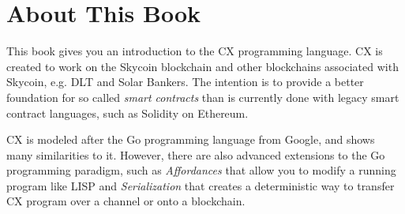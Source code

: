 \documentclass[11pt,fleqn,openany]{book} %
\begin{document}
\noindent \textit{} %



\pagestyle{empty} %

\tableofcontents %


\pagestyle{fancy} %




\chapter{About This Book}
\label{chapter:about-this-book}

This book gives you an introduction to the CX programming language. CX is created to work on the Skycoin blockchain and other blockchains associated with Skycoin, e.g. DLT and Solar Bankers.  The intention is to provide a better foundation for so called \emph{smart contracts} than is currently done with legacy smart contract languages, such as Solidity on Ethereum.

CX is modeled after the Go programming language from Google, and shows many similarities to it. However, there are also advanced extensions to the Go programming paradigm, such as \emph{Affordances} that allow you to modify a running program like LISP and \emph{Serialization} that creates a deterministic way to transfer CX program over a channel or onto a blockchain.

\end{document}

